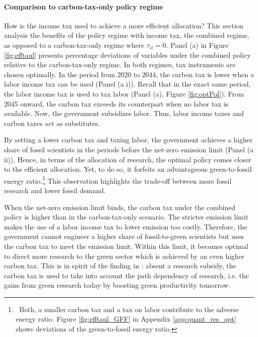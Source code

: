 \paragraph{Comparison to carbon-tax-only policy regime}
How is the income tax used to achieve a more efficient allocation?
This section analysis the benefits of the policy regime with income tax, the {combined} regime, as opposed to a {carbon-tax-only} regime where $\tau_{\iota t}=0$.  
Panel (a)  in Figure \ref{fig:efftaul} presents percentage deviations of variables under the combined policy relative to the carbon-tax-only regime. In both regimes, tax instruments are chosen optimally. In the period from 2020 to 2044, the carbon tax is lower when a labor income tax can be used (Panel (a i)). Recall that in the exact same period, the labor income tax is used to tax labor (Panel (a), Figure \ref{fig:optPol}). From 2045 onward, the carbon tax exceeds its counterpart when no labor tax is available. Now, the government subsidizes labor. Thus, labor income taxes and carbon taxes act as substitutes.

By setting a lower carbon tax and taxing labor, the government achieves a higher share of fossil scientists in the periods before the net-zero emission limit (Panel (a ii)). 
Hence, in terms of the allocation of research, the optimal policy comes closer to the efficient allocation. Yet, to do so, it forfeits an advantageous green-to-fossil energy ratio.\footnote{ \ Both, a smaller carbon tax and a tax on labor contribute to the adverse energy ratio. Figure \ref{fig:efftaul_GFF} in Appendix \ref{app:quant_res_opt} shows deviations of the green-to-fossil energy ratio.} This observation highlights the trade-off between more fossil research and lower fossil demand. 

When the net-zero emission limit binds, the carbon tax under the combined policy is higher than in the carbon-tax-only scenario.
 The  stricter emission limit makes the use of a labor income tax to lower emission too costly. Therefore, the government cannot engineer a higher share of fossil-to-green scientists but uses the carbon tax to meet the emission limit. Within this limit, it becomes optimal to direct more research to the green sector which is achieved by an even higher carbon tax. This is in spirit of the finding in \cite{Acemoglu2012TheChange}: absent a research subsidy, the carbon tax is used to take into account the path dependency of research, i.e. the gains from green research today by boosting green productivity tomorrow.
 
